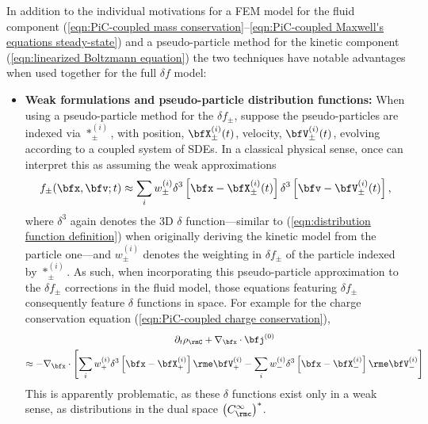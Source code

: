     In addition to the individual motivations for a FEM model for the fluid component (\ref{eqn:PiC-coupled mass conservation}--\ref{eqn:PiC-coupled Maxwell's equations steady-state}) and a pseudo-particle method for the kinetic component (\ref{eqn:linearized Boltzmann equation}) the two techniques have notable advantages when used together for the full $\delta\!f$ model:
    \begin{itemize}
        \item  {\bf Weak formulations and pseudo-particle distribution functions:} When using a pseudo-particle method for the $\delta\!f_{\pm}$, suppose the pseudo-particles are indexed via $*_{\pm}^{(i)}$, with position, $\bfX_{\pm}^{(i)}(t)$, velocity, $\bfV_{\pm}^{(i)}(t)$, evolving according to a coupled system of SDEs. In a classical physical sense, once can interpret this as assuming the weak approximations
        \begin{equation}
            f_{\pm}(\bfx, \bfv; t)  \approx  \sum_{i}w_{\pm}^{(i)}\delta^{3}\left[\bfx - \bfX_{\pm}^{(i)}(t)\right]\delta^{3}\left[\bfv - \bfV_{\pm}^{(i)}(t)\right],
        \end{equation}
        where $\delta^{3}$ again denotes the 3D $\delta$ function---similar to (\ref{eqn:distribution function definition}) when originally deriving the kinetic model from the particle one---and $w_{\pm}^{(i)}$ denotes the weighting in $\delta\!f_{\pm}$ of the particle indexed by $*_{\pm}^{(i)}$. As such, when incorporating this pseudo-particle approximation to the $\delta\!f_{\pm}$ corrections in the fluid model, those equations featuring $\delta\!f_{\pm}$ consequently feature $\delta$ functions in space. For example for the charge conservation equation (\ref{eqn:PiC-coupled charge conservation}),
        \begin{multline}\label{eqn:PiC-coupled charge conservation with pseudo-particles}
            \partial_{t}\rho_{\rmC} + \nabla_{\bfx}\cdot\bfj^{(0)}  \\
            \approx  - \nabla_{\bfx}\cdot\left[\sum_{i}w_{+}^{(i)}\delta^{3}\left[\bfx - \bfX_{+}^{(i)}\right]\rme\bfV_{+}^{(i)} - \sum_{i}w_{-}^{(i)}\delta^{3}\left[\bfx - \bfX_{-}^{(i)}\right]\rme\bfV_{-}^{(i)}\right]
        \end{multline}        
        This is apparently problematic, as these $\delta$ functions exist only in a weak sense, as distributions in the dual space $\left(C^{\infty}_{\rmc}\right)^{*}$.
        

\end{itemize}
